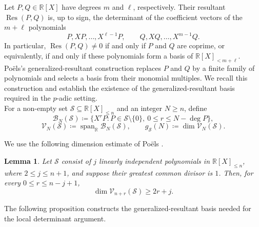 \documentclass[12pt,reqno]{amsart}
\newtheorem{lemma}[theorem]{Lemma}
\theoremstyle{definition}
\theoremstyle{remark}
\newcommand{\R}{\mathbb R}
\newcommand{\calB}{\mathcal B}
\newcommand{\calV}{\mathcal V}
\newcommand{\Span}{\operatorname{span}}
\begin{document}
Let $P,Q\in\R[X]$ have degrees $m$ and $\ell$, respectively. Their
resultant $\operatorname{Res}(P,Q)$ is, up to sign, the determinant of the
coefficient vectors of the $m+\ell$ polynomials
$$
P,XP,\ldots,X^{\ell-1}P,
\qquad
Q,XQ,\ldots,X^{m-1}Q.
$$
In particular, $\operatorname{Res}(P,Q)\neq0$ if and only if $P$ and $Q$ are
coprime, or equivalently, if and only if these polynomials form a basis of
$\R[X]_{<m+\ell}$. Po\"els's generalized-resultant construction replaces
$P$ and $Q$ by a finite family of polynomials and selects a basis from their
monomial multiples. We recall this construction and establish the existence of
the generalized-resultant basis required in the $p$-adic setting.\\

 For a
non-empty set $\mathcal S\subseteq\R[X]_{\leq n}$ and an integer $N\geq n$,
define
$$
\calB_N(\mathcal S)
\coloneqq
\{X^rP: P\in\mathcal S\setminus\{0\},\ 0\leq r\leq N-\deg P\},
$$
$$
\calV_N(\mathcal S)
\coloneqq\Span_{\R}\calB_N(\mathcal S),
\qquad
g_{\mathcal S}(N)\coloneqq\dim\calV_N(\mathcal S).
$$


We use the following dimension estimate of Po\"els
\cite[Lemma~5.2]{PoelsWirsing}.

\begin{lemma}\label{lem:intermediate-dimension}
Let $\mathcal S$ consist of $j$ linearly independent polynomials in $\R[X]_{\leq n}$, where $2\leq j\leq n+1$, and suppose their greatest common divisor is $1$. Then, for every $0\leq r\leq n-j+1$,
$$
\dim\calV_{n+r}(\mathcal S)\geq2r+j.
$$
\end{lemma}

The following proposition constructs the generalized-resultant basis needed
for the local determinant argument.
\end{document}
